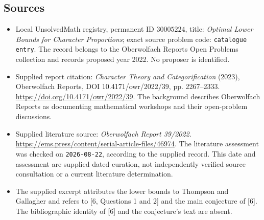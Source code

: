 \documentclass[11pt]{article}
\begin{document}
\subsection{Sources}
\begin{itemize}
\item Local UnsolvedMath registry, permanent ID \(30005224\), title: \emph{Optimal Lower Bounds for Character Proportions}; exact source problem code: \texttt{catalogue entry}. The record belongs to the Oberwolfach Reports Open Problems collection and records proposed year 2022. No proposer is identified.
\item Supplied report citation: \emph{Character Theory and Categorification} (2023), Oberwolfach Reports, DOI 10.4171/owr/2022/39, pp. 2267--2333. \url{https://doi.org/10.4171/owr/2022/39}. The background describes Oberwolfach Reports as documenting mathematical workshops and their open-problem discussions.
\item Supplied literature source: \emph{Oberwolfach Report 39/2022}. \url{https://ems.press/content/serial-article-files/46974}. The literature assessment was checked on \texttt{2026-08-22}, according to the supplied record. This date and assessment are supplied dated curation, not independently verified source consultation or a current literature determination.
\item The supplied excerpt attributes the lower bounds to Thompson and Gallagher and refers to [6, Questions 1 and 2] and the main conjecture of [6]. The bibliographic identity of [6] and the conjecture's text are absent.
\end{itemize}
\end{document}

